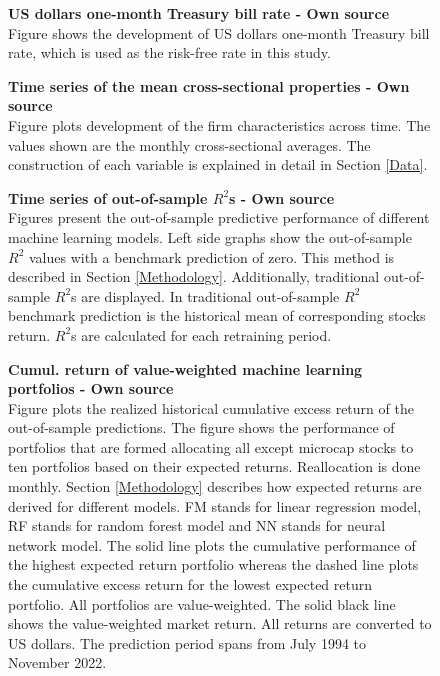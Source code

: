 \documentclass[12pt]{article}
\begin{document}
\begin{appendices}
\begin{figure}[H]
\centering
\caption[US dollar one-month Treasury bill rate]{\textbf{US dollars one-month Treasury bill rate \textnormal{- Own source}}\\ Figure shows the development of US dollars one-month Treasury bill rate, which is used as the risk-free rate in this study.}

\label{plot:rf_ts}
\end{figure}

\begin{figure}[H]
\centering
\caption[Time series of the mean cross-sectional properties]{\textbf{Time series of the mean cross-sectional properties \textnormal{- Own source}}\\ Figure plots development of the firm characteristics across time. The values shown are the monthly cross-sectional averages. The construction of each variable is explained in detail in Section \ref{Data}.}

\label{plot:variableTS}
\end{figure}

\begin{figure}[H]
\centering
\caption[Time series of out-of-sample $R^2$ values]{\textbf{Time series of out-of-sample \boldmath$R^2$s \textnormal{- Own source}}\\ Figures present the out-of-sample predictive performance of different machine learning models. Left side graphs show the out-of-sample $R^2$ values with a benchmark prediction of zero. This method is described in Section \ref{Methodology}. Additionally, traditional out-of-sample $R^2$s are displayed. In traditional out-of-sample $R^2$ benchmark prediction is the historical mean of corresponding stocks return. $R^2$s are calculated for each retraining period.}

\label{plot:OOSR2_ts}
\end{figure}

\begin{figure}[H]
\centering
\caption[Cumulative return of value-weighted machine learning portfolios]{\textbf{Cumul. return of value-weighted machine learning portfolios \textnormal{- Own source}}\\ Figure plots the realized historical cumulative excess return of the out-of-sample predictions. The figure shows the performance of portfolios that are formed allocating all except microcap stocks to ten portfolios based on their expected returns. Reallocation is done monthly. Section \ref{Methodology} describes how expected returns are derived for different models. FM stands for linear regression model, RF stands for random forest model and NN stands for neural network model. The solid line plots the cumulative performance of the highest expected return portfolio whereas the dashed line plots the cumulative excess return for the lowest expected return portfolio. All portfolios are value-weighted. The solid black line shows the value-weighted market return. All returns are converted to US dollars. The prediction period spans from July 1994 to November 2022.}

\label{plot:cumul_vw_portf_return}
\end{figure}


\end{appendices}
\end{document}
